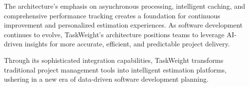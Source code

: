 \documentclass[12pt,a4paper]{article}
\begin{document}
The architecture's emphasis on asynchronous processing, intelligent caching, and comprehensive performance tracking creates a foundation for continuous improvement and personalized estimation experiences. As software development continues to evolve, TaskWeight's architecture positions teams to leverage AI-driven insights for more accurate, efficient, and predictable project delivery.

Through its sophisticated integration capabilities, TaskWeight transforms traditional project management tools into intelligent estimation platforms, ushering in a new era of data-driven software development planning.
\end{document}
